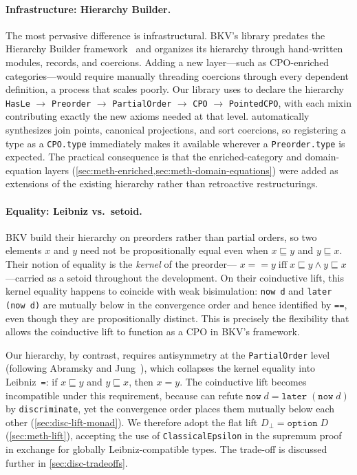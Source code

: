 \paragraph{Infrastructure: Hierarchy Builder.}
The most pervasive difference is infrastructural.
BKV's library predates the Hierarchy Builder framework~\cite{HB2023}
and organizes its hierarchy through hand-written modules, records, and
coercions.
Adding a new layer---such as CPO-enriched categories---would require
manually threading coercions through every dependent definition, a
process that scales poorly.
Our library uses \HB{} to declare the hierarchy
\texttt{HasLe} $\to$ \texttt{Preorder} $\to$ \texttt{PartialOrder}
$\to$ \texttt{CPO} $\to$ \texttt{PointedCPO},
with each mixin contributing exactly the new axioms needed at that level.
\HB{} automatically synthesizes join points, canonical projections, and
sort coercions, so registering a type as a \texttt{CPO.type}
immediately makes it available wherever a \texttt{Preorder.type} is
expected.
The practical consequence is that the enriched-category and
domain-equation layers (\cref{sec:meth-enriched,sec:meth-domain-equations})
were added as extensions of the existing hierarchy rather than
retroactive restructurings.

\paragraph{Equality: Leibniz vs.\ setoid.}
BKV build their hierarchy on preorders rather than partial orders,
so two elements $x$ and $y$ need not be propositionally equal even
when $x \sqsubseteq y$ and $y \sqsubseteq x$.
Their notion of equality is the \emph{kernel} of the preorder---
$x == y \;\text{iff}\; x \sqsubseteq y \land y
\sqsubseteq x$---carried as a setoid throughout the development.
On their coinductive lift, this kernel equality happens to coincide
with weak bisimulation: \texttt{now d} and \texttt{later (now d)} are
mutually below in the convergence order and hence identified by
\texttt{==}, even though they are propositionally distinct.
This is precisely the flexibility that allows the coinductive lift to
function as a CPO in BKV's framework.

Our hierarchy, by contrast, requires antisymmetry at the
\texttt{PartialOrder} level (following Abramsky and
Jung~\cite{AJ1994}), which collapses the kernel equality into
Leibniz~\texttt{=}: if $x \sqsubseteq y$ and $y \sqsubseteq x$, then
$x = y$.
The coinductive lift becomes incompatible under this requirement,
because \Rocq{} can refute
$\texttt{now}\;d = \texttt{later}\;(\texttt{now}\;d)$ by
\texttt{discriminate}, yet the convergence order places them mutually
below each other (\cref{sec:disc-lift-monad}).
We therefore adopt the flat lift $D_\bot = \texttt{option}\;D$
(\cref{sec:meth-lift}), accepting the use of
\texttt{ClassicalEpsilon} in the supremum proof in exchange for
globally Leibniz-compatible types.
The trade-off is discussed further in \cref{sec:disc-tradeoffs}.

